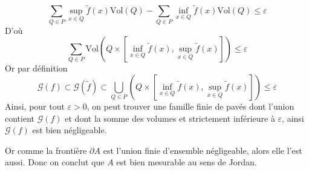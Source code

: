 \documentclass[10pt]{article}
\begin{document}
\[
\sum_{Q \in P} \sup_{x \in Q} \tilde f(x) \mathrm{Vol}(Q) - \sum_{Q \in P} \inf_{x \in Q} \tilde f(x) \mathrm{Vol}(Q) \leqslant \varepsilon
\]
D'où
\[
\sum_{Q \in P} \mathrm{Vol} \left(Q \times \left[\inf_{x \in Q} \tilde f(x), \sup_{x \in Q} \tilde f(x) \right]\right) \leqslant \varepsilon
\]
Or par définition
\[
\mathcal G(f) \subset \mathcal G(\tilde f) \subset \bigcup_{Q \in P} \left(Q \times \left[\inf_{x \in Q} \tilde f(x), \sup_{x \in Q} \tilde f(x) \right]\right) \leqslant \varepsilon
\]
Ainsi, pour tout $\varepsilon > 0$, on peut trouver une famille finie de pavés dont l'union contient $\mathcal G(f)$ et dont la somme des volumes et strictement inférieure à $\varepsilon$, ainsi $\mathcal G(f)$ est bien négligeable. 

Or comme la frontière $\partial A$ est l'union finie d'ensemble négligeable, alors elle l'est aussi. Donc on conclut que $A$ est bien mesurable au sens de Jordan. 
\end{document}
